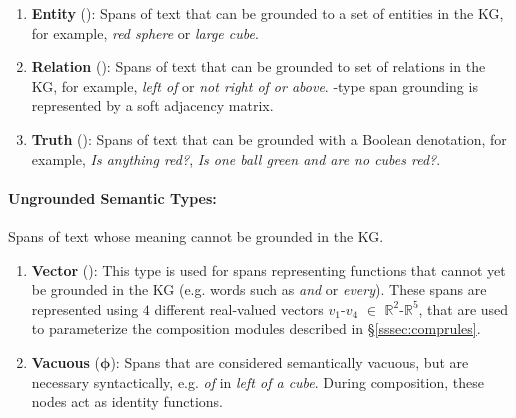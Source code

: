 \documentclass[main.tex]{subfiles}
\begin{document}
\begin{enumerate}
    \item
    {\bf Entity} (): Spans of text that can be grounded to a set of entities in the KG, for example, \emph{red sphere} or \emph{large cube}.

    \item
    {\bf Relation} (): Spans of text that can be grounded to set of relations in the KG, for example, \emph{left of} or \emph{not right of or above}. %
    -type span grounding is represented by a soft adjacency matrix. %

    \item
    {\bf Truth} (): Spans of text that can be grounded with a Boolean denotation, for example, \emph{Is anything red?}, \emph{Is one ball green and are no cubes red?}.
\end{enumerate}

\paragraph{Ungrounded Semantic Types:} Spans of text whose meaning cannot be grounded in the KG.

\begin{enumerate}%
\item
{\bf Vector} ():
    This type is used for spans representing functions that cannot yet be grounded in the KG (e.g. words such as \emph{and} or \emph{every}).
    These spans are represented using $4$ different real-valued vectors $v_{1}$-$v_{4}$ $\in$ $\mathbb{R}^{2}$-$\mathbb{R}^{5}$, that are used to parameterize the composition modules described in \S \ref{sssec:comprules}.


    \item
    {\bf Vacuous} ($\pmb{\phi}$): Spans that are considered semantically vacuous, but are necessary syntactically, e.g. \emph{of} in \emph{left of a cube}. During composition, these nodes act as identity functions. %
\end{enumerate}
\end{document}
